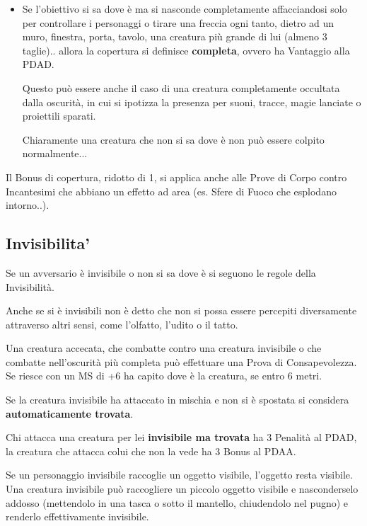 \documentclass[12pt,a4paper,twoside,openany]{book}
\begin{document}
\begin{multicols}{2}
\begin{itemize}
\item
Se l'obiettivo si sa dove è ma si nasconde completamente affacciandosi solo per controllare i personaggi o tirare una freccia ogni tanto, dietro ad un muro, finestra, porta, tavolo, una creatura più grande di lui (almeno 3 taglie).. allora la copertura si definisce \textbf{completa}, ovvero ha Vantaggio alla PDAD.

Questo può essere anche il caso di una creatura completamente occultata dalla oscurità, in cui si ipotizza la presenza per suoni, tracce, magie lanciate o proiettili sparati.
		
Chiaramente una creatura che non si sa dove è non può essere colpito normalmente...
		
\end{itemize}
	
Il Bonus di copertura, ridotto di 1, si applica anche alle Prove di Corpo contro Incantesimi che abbiano un effetto ad area (es. Sfere di Fuoco che esplodano intorno..).
	
\subsection{Invisibilita'} \hypertarget{invisibilita}{}\label{invisibilita}
	
Se un avversario è invisibile o non si sa dove è si seguono le regole della Invisibilità.

Anche se si è invisibili non è detto che non si possa essere percepiti diversamente attraverso altri sensi, come l'olfatto, l'udito o il tatto. 	

Una creatura accecata, che combatte contro una creatura invisibile o che combatte nell'oscurità più completa può effettuare una Prova di Consapevolezza. Se riesce con un MS di +6 ha capito dove è la creatura, se entro 6 metri.
	
Se la creatura invisibile ha attaccato in mischia e non si è spostata si considera \textbf{automaticamente trovata}.
	
Chi attacca una creatura per lei \textbf{invisibile ma trovata} ha 3 Penalità al PDAD, la creatura che attacca colui che non la vede ha 3 Bonus al PDAA.
	
\bigskip
	
Se un personaggio invisibile raccoglie un oggetto visibile, l'oggetto resta visibile. Una creatura invisibile può raccogliere un piccolo oggetto visibile e nasconderselo addosso (mettendolo in una tasca o sotto il mantello, chiudendolo nel pugno) e renderlo effettivamente invisibile.
	

\end{multicols}
\end{document}
